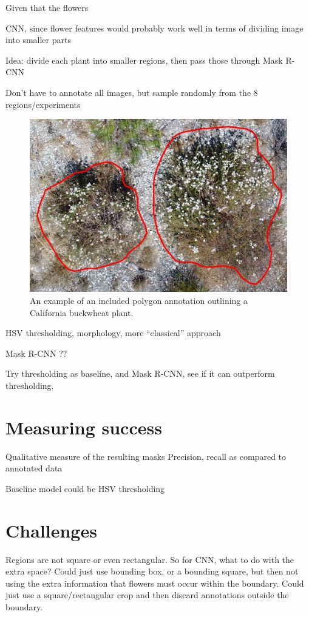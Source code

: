 \documentclass[10pt,twocolumn,letterpaper]{article}
\begin{document}
Given that the flowers

CNN, since flower features would probably work well in terms of dividing image into smaller parts

Idea: divide each plant into smaller regions, then pass those through Mask R-CNN

Don't have to annotate all images, but sample randomly from the 8 regions/experiments

\begin{figure}[t]
  \centering
   \includegraphics[width=0.9\linewidth]{annotation.jpg}
   \caption{An example of an included polygon annotation outlining a California buckwheat plant.}
   \label{fig:annotation}
\end{figure}

HSV thresholding, morphology, more ``classical'' approach

Mask R-CNN ??

Try thresholding as baseline, and Mask R-CNN, see if it can outperform thresholding.

\section{Measuring success}

Qualitative measure of the resulting masks
Precision, recall as compared to annotated data

Baseline model could be HSV thresholding

\section{Challenges}

Regions are not square or even rectangular. So for CNN, what to do with the extra space? Could just use bounding box, or a bounding square, but then not using the extra information that flowers must occur within the boundary. Could just use a square/rectangular crop and then discard annotations outside the boundary.
\end{document}
